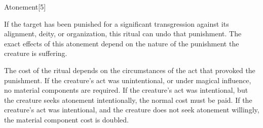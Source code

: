 \begin{spellsection}{Atonement}[5]
    \begin{spellheader}
    \end{spellheader}
    \begin{spellcontent}
        \begin{spelltargetinginfo}
        \end{spelltargetinginfo}
        \begin{spelleffects}
            \spelleffect If the target has been punished for a significant transgression against its alignment, deity, or organization, this ritual can undo that punishment. The exact effects of this atonement depend on the nature of the punishment the creature is suffering.

            The cost of the ritual depends on the circumstances of the act that provoked the punishment. If the creature's act was unintentional, or under magical influence, no material components are required. If the creature's act was intentional, but the creature seeks atonement intentionally, the normal cost must be paid. If the creature's act was intentional, and the creature does not seek atonement willingly, the material component cost is doubled.
        \end{spelleffects}
    \end{spellcontent}
    \begin{spellfooter}
    \end{spellfooter}
\end{spellsection}

